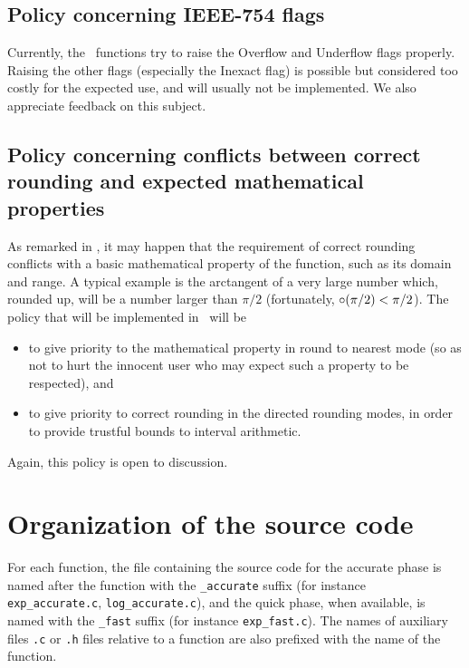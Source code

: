 \subsection{Policy concerning IEEE-754 flags}

Currently, the \crlibm\ functions try to raise the Overflow and
Underflow flags properly. Raising the other flags (especially the
Inexact flag) is possible but considered too costly for the expected
use, and will usually not be implemented. We also appreciate feedback
on this subject.

\subsection{Policy concerning conflicts between correct rounding and
  expected mathematical properties}
As remarked in \cite{DefHanLefMulRevZim2004}, it may happen that the
requirement of correct rounding conflicts with a basic mathematical
property of the function, such as its domain and range. A typical
example is the arctangent of a very large number which, rounded up,
will be a number larger than $\pi/2$ (fortunately, $\circ(\pi/2) <
\pi/2$). The policy that will be implemented in \crlibm\ will be
\begin{itemize}
\item to give priority to the mathematical property in round to
  nearest mode (so as not to hurt the innocent user who may expect
  such a property to be respected), and 
\item to give priority to correct rounding in the directed rounding
  modes, in order to provide trustful bounds to interval arithmetic.
\end{itemize}

Again, this policy is open to discussion.

\section{Organization of the source code}

For each function, the file containing the source code for the
accurate phase is named after the function with the
\texttt{\_accurate} suffix (for instance \texttt{exp\_accurate.c},
\texttt{log\_accurate.c}), and the quick phase, when available, is
named with the \texttt{\_fast} suffix (for instance
\texttt{exp\_fast.c}). The names of auxiliary files \texttt{.c} or
\texttt{.h} files relative to a function are also prefixed with the
name of the function.

